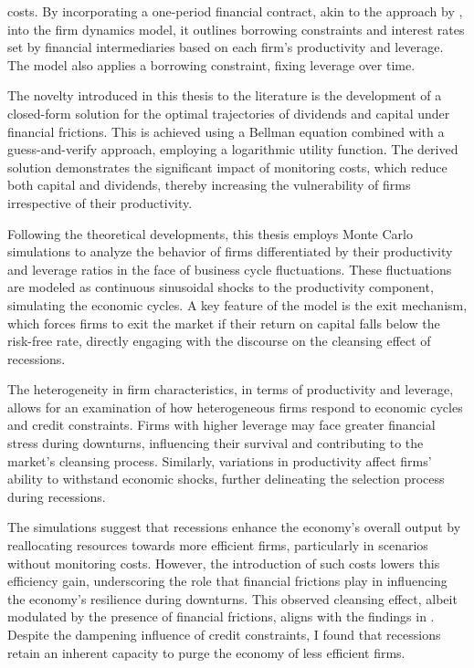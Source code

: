 costs. By incorporating a one-period financial contract, akin to the approach by \cite{BerGer86}, into the firm dynamics
model, it outlines borrowing constraints and interest rates set by financial intermediaries based on each firm's
productivity and leverage. The model also applies a borrowing constraint, fixing leverage over time. 
\par
The novelty introduced in this thesis to the literature is the development of a closed-form solution for the optimal
trajectories of dividends and capital under financial frictions. This is achieved using a Bellman equation combined with
a guess-and-verify approach, employing a logarithmic utility function. The derived solution demonstrates the significant
impact of monitoring costs, which reduce both capital and dividends, thereby increasing the vulnerability of firms
irrespective of their productivity. 
\par
Following the theoretical developments, this thesis employs Monte Carlo simulations to analyze the behavior of firms
differentiated by their productivity and leverage ratios in the face of business cycle fluctuations. These fluctuations
are modeled as continuous sinusoidal shocks to the productivity component, simulating the economic cycles. A key feature
of the model is the exit mechanism, which forces firms to exit the market if their return on capital falls below the
risk-free rate, directly engaging with the discourse on the cleansing effect of recessions.  
\par
The heterogeneity in firm characteristics, in terms of productivity and leverage, allows for an examination of how
heterogeneous firms respond to economic cycles and credit constraints. Firms with higher leverage may face greater
financial stress during downturns, influencing their survival and contributing to the market's cleansing process.
Similarly, variations in productivity affect firms' ability to withstand economic shocks, further delineating the
selection process during recessions. 

The simulations suggest that recessions enhance the economy's overall output by reallocating resources towards more
efficient firms, particularly in scenarios without monitoring costs. However, the introduction of such costs lowers this
efficiency gain, underscoring the role that financial frictions play in influencing the economy's resilience during
downturns. This observed cleansing effect, albeit modulated by the presence of financial frictions, aligns with the
findings in \cite{OsePap17}. Despite the dampening influence of credit constraints, I found that recessions retain an
inherent capacity to purge the economy of less efficient firms. 